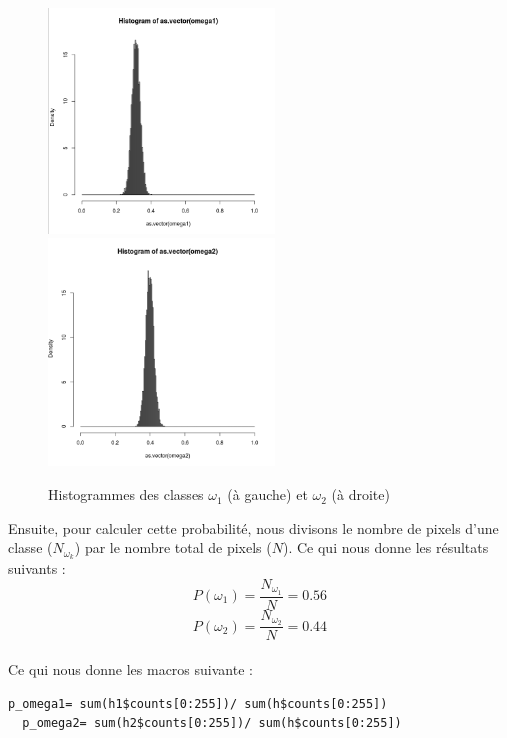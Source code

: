\documentclass[a4paper,11pt]{article}
\begin{document}
  \begin{figure}[H]
    \center
    \includegraphics[width=6cm]{resultat/hist_omega1.png}
    \includegraphics[width=6cm]{resultat/hist_omega2.png}
    \caption{Histogrammes des classes $\omega_{1}$ (à gauche) et $\omega_{2}$ (à droite)}
  \end{figure}
  
  Ensuite, pour calculer cette probabilité, nous divisons le nombre de pixels d'une classe ($N_{\omega_k}$) par
  le nombre total de pixels ($N$). Ce qui nous donne les résultats suivants :
  $$P(\omega_{1}) = \frac{ N_{\omega_{1}} }{ N } = 0.56$$
  $$P(\omega_{2}) = \frac{ N_{\omega_{2}} }{ N } = 0.44$$\\
  
  Ce qui nous donne les macros suivante :\\
  
  \begin{lstlisting}[caption=Macros de calcule de probabilité à priori des classe $N_{w_1}$ et $N_{w_2}$]
  p_omega1= sum(h1$counts[0:255])/ sum(h$counts[0:255])
  p_omega2= sum(h2$counts[0:255])/ sum(h$counts[0:255])\end{lstlisting}
  
\end{document}
